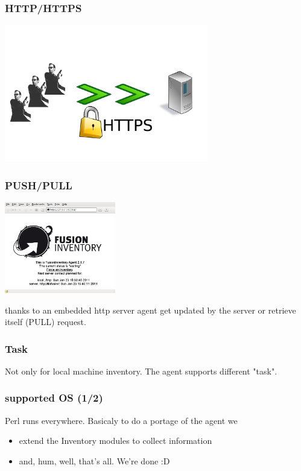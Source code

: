 \begin{frame}
    \frametitle{HTTP/HTTPS}

    \includegraphics[height=6.0cm]{pics/https.pdf}
\end{frame}

\begin{frame}
    \frametitle{PUSH/PULL}
    \includegraphics[height=4.0cm]{pics/http-server.png}

    thanks to an embedded http server agent get updated by the server or retrieve itself (PULL) request.
\end{frame}

\begin{frame}
    \frametitle{Task}
    Not only for local machine inventory. The agent supports different "task".
\end{frame}

\begin{frame}
    \frametitle{supported OS (1/2)}
    Perl runs everywhere.
    \pause
    Basicaly to do a portage of the agent we
    \begin{itemize}
        \item extend the Inventory modules to collect information
        \item and, hum, well, that's all. We're done :D
    \end{itemize}
\end{frame}

